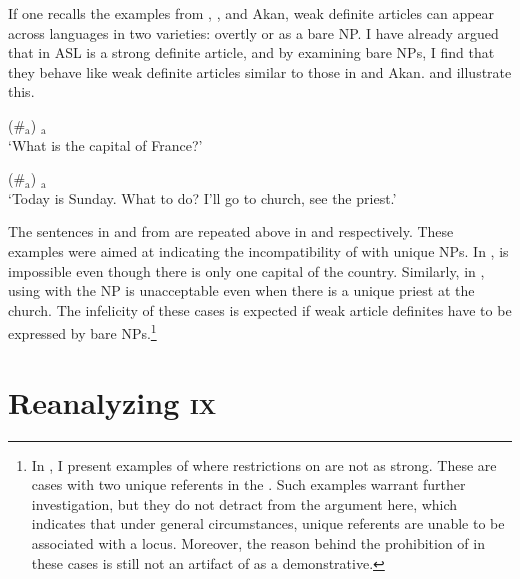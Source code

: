 \documentclass[output=paper,
modfonts
]{langscibook}
\begin{document}
If one recalls the examples from , , and Akan, weak definite articles can appear across languages in two varieties: overtly or as a bare NP. I have already argued that  in ASL is a strong definite article, and by examining bare NPs, I find that they behave like weak definite articles similar to those in  and Akan.  and  illustrate this.  

\begin{exe}
\ex \label{ex:irani:33}  (\#$_\text{a}$) $_\text{a}$ \\
`What is the capital of France?’ \citep[234]{KoulidobrovaLilloMartin2016}

\ex \label{ex:irani:34}  (\#$_\text{a}$) $_\text{a}$\\
`Today is Sunday. What to do? I’ll go to church, see the priest.' \\ \citep[234]{KoulidobrovaLilloMartin2016}
\end{exe}

The sentences in  and  from \citet{KoulidobrovaLilloMartin2016} are repeated above in  and  respectively. These examples were aimed at indicating the incompatibility of  with unique NPs. In ,  is impossible even though there is only one capital of the country. Similarly, in , using  with the NP  is unacceptable even when there is a unique priest at the church. The infelicity of these cases is expected if weak article definites have to be expressed by bare NPs.\footnote{In , I present examples of where  restrictions on  are not as strong. These are cases with two unique referents in the . Such examples warrant further investigation, but they do not detract from the argument here, which indicates that under general circumstances, unique referents are unable to be associated with a locus. Moreover, the reason behind the prohibition of  in these cases is still not an artifact of  as a demonstrative.} 

\section{Reanalyzing \textsc{ix}}
\end{document}
